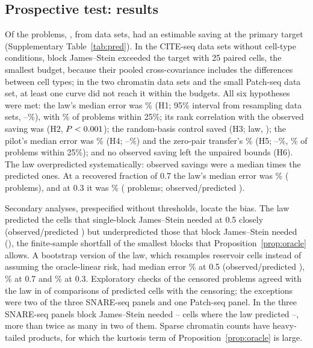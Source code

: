 \subsection*{Prospective test: results}
Of the \PredNProblems{} problems, \PredNEstimable, from \PredNEstimableData{} data sets, had an estimable saving at the primary target (Supplementary Table~\ref{tab:pred}). In the \PredNEasy{} CITE-seq data sets without cell-type conditions, block James--Stein exceeded the target with 25 paired cells, the smallest budget, because their pooled cross-covariance includes the differences between cell types; in the two chromatin data sets and the small Patch-seq data set, at least one curve did not reach it within the budgets. All six hypotheses were met: the law's median error was \PredLawErr\% (H1; 95\% interval from resampling data sets, \PredLawErrLo--\PredLawErrHi\%), with \PredLawWithin\% of problems within 25\%; its rank correlation with the observed saving was \PredRho{} (H2, $P<0.001$); the random-basis control saved \PredRandomObs{} (H3; law, \PredRandomLaw); the pilot's median error was \PredPilotErr\% (H4; \PredPilotErrLo--\PredPilotErrHi\%) and the zero-pair transfer's \PredTransferErr\% (H5; \PredTransferErrLo--\PredTransferErrHi\%, \PredTransferWithin\% of problems within 25\%); and no observed saving left the unpaired bounds (H6). The law overpredicted systematically: observed savings were a median \PredLawRatio{} times the predicted ones. At a recovered fraction of 0.7 the law's median error was \PredLawErrSeven\% (\PredNSeven{} problems), and at 0.3 it was \PredLawErrThree\% (\PredNThree{} problems; observed/predicted \PredLawRatioThree).

Secondary analyses, prespecified without thresholds, locate the bias. The law predicted the cells that single-block James--Stein needed at 0.5 closely (observed/predicted \PredCellsJsRatio) but underpredicted those that block James--Stein needed (\PredCellsBlocksRatio), the finite-sample shortfall of the smallest blocks that Proposition~\ref{prop:oracle} allows. A bootstrap version of the law, which resamples reservoir cells instead of assuming the oracle-linear risk, had median error \PredBootErr\% at 0.5 (observed/predicted \PredBootRatio), \PredBootErrSeven\% at 0.7 and \PredBootErrThree\% at 0.3. Exploratory checks of the censored problems agreed with the law in \PredCensAgree{} of \PredCensTotal{} comparisons of predicted cells with the censoring; the exceptions were two of the three SNARE-seq panels and one Patch-seq panel. In the three SNARE-seq panels block James--Stein needed \PredSnareObsMin--\PredSnareObsMax{} cells where the law predicted \PredSnareLawMin--\PredSnareLawMax, more than twice as many in two of them. Sparse chromatin counts have heavy-tailed products, for which the kurtosis term of Proposition~\ref{prop:oracle} is large.

